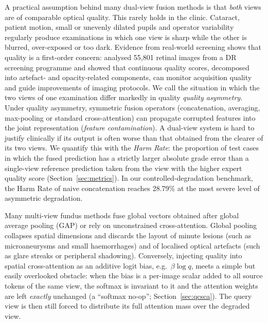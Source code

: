 \documentclass[final,5p,times,twocolumn,authoryear]{elsarticle}
\theoremstyle{plain}
\theoremstyle{remark}
\begin{document}
A practical assumption behind many dual-view fusion methods is that \emph{both} views are of comparable optical quality. This rarely holds in the clinic. Cataract, patient motion, small or unevenly dilated pupils and operator variability regularly produce examinations in which one view is sharp while the other is blurred, over-exposed or too dark. Evidence from real-world screening shows that quality is a first-order concern: \citet{Pinto2026riqmonitor} analysed 55{,}801 retinal images from a DR screening programme and showed that continuous quality scores, decomposed into artefact- and opacity-related components, can monitor acquisition quality and guide improvements of imaging protocols. We call the situation in which the two views of one examination differ markedly in quality \emph{quality asymmetry}. Under quality asymmetry, symmetric fusion operators (concatenation, averaging, max-pooling or standard cross-attention) can propagate corrupted features into the joint representation (\emph{feature contamination}). A dual-view system is hard to justify clinically if its output is often worse than that obtained from the clearer of its two views. We quantify this with the \emph{Harm Rate}: the proportion of test cases in which the fused prediction has a strictly larger absolute grade error than a single-view reference prediction taken from the view with the higher expert quality score (Section~\ref{sec:metrics}). In our controlled-degradation benchmark, the Harm Rate of naive concatenation reaches 28.79\% at the most severe level of asymmetric degradation.

Many multi-view fundus methods fuse global vectors obtained after global average pooling (GAP) or rely on unconstrained cross-attention. Global pooling collapses spatial dimensions and discards the layout of minute lesions (such as microaneurysms and small haemorrhages) and of localised optical artefacts (such as glare streaks or peripheral shadowing). Conversely, injecting quality into spatial cross-attention as an additive logit bias, e.g.\ $\beta\log q$, meets a simple but easily overlooked obstacle: when the bias is a per-image scalar added to all source tokens of the same view, the softmax is invariant to it and the attention weights are left \emph{exactly} unchanged (a ``softmax no-op''; Section~\ref{sec:qcsca}). The query view is then still forced to distribute its full attention mass over the degraded view.
\end{document}
